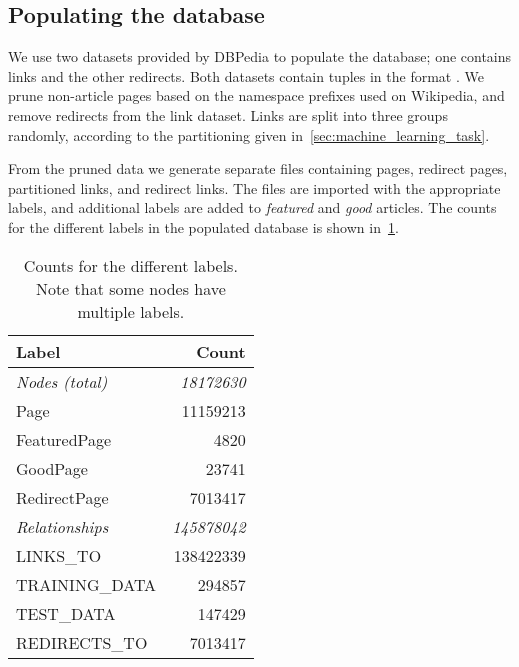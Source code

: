 \subsection{Populating the database} \label{sec:db_populate}
We use two datasets provided by DBPedia to populate the database; one contains links and the other redirects. Both datasets contain tuples in the format .  We prune non-article pages based on the namespace prefixes used on Wikipedia, and remove redirects from the link dataset. Links are split into three groups randomly, according to the partitioning given in~\cref{sec:machine_learning_task}. 

From the pruned data we generate separate files containing pages, redirect pages, partitioned links, and redirect links. The files are imported with the appropriate labels, and additional labels are added to \emph{featured} and \emph{good} articles.
 The counts for the different labels in the populated database is shown in~\cref{tab:db_counts}.

\begin{table}[tbp]
\centering
\begin{tabular}{@{}lr@{}}
\toprule
\textbf{Label}         & \textbf{Count}     \\ \midrule
\textit{Nodes (total)} & \textit{18172630}  \\
Page                   & 11159213           \\
FeaturedPage           & 4820               \\
GoodPage               & 23741              \\
RedirectPage           & 7013417            \\ \midrule
\textit{Relationships} & \textit{145878042} \\
LINKS\_TO              & 138422339          \\
TRAINING\_DATA         & 294857             \\
TEST\_DATA             & 147429             \\
REDIRECTS\_TO          & 7013417            \\ \bottomrule
\end{tabular}
\caption{Counts for the different labels. Note that some nodes have multiple labels.}
\label{tab:db_counts}
\end{table}

